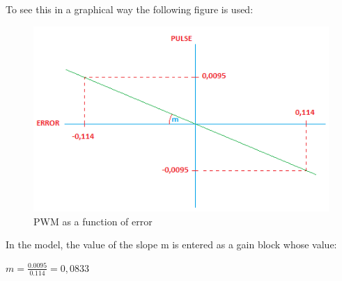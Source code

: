 To see this in a graphical way the following figure is used:
\begin{figure}[H]
    \centering
    \includegraphics[width=\textwidth]{Images/Ball and Bean/Hardware/SCALE.png}
    \caption{PWM as a function of error }
    \label{fig45}
\end{figure}
In the model, the value of the slope m is entered as a gain block whose value:

\centering
\begin{math}
    m = \frac{0.0095}{0.114} = 0,0833    
\end{math}



